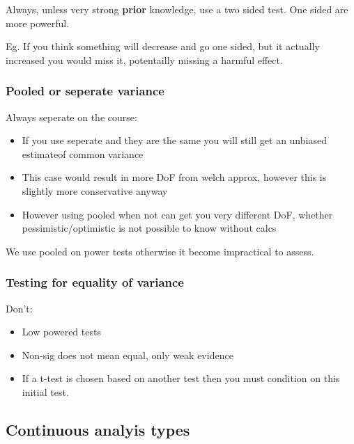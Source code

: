 \documentclass[
  letterpaper,
  DIV=11,
  numbers=noendperiod]{scrreprt}
\providecommand{\tightlist}{%
  \setlength{\itemsep}{0pt}\setlength{\parskip}{0pt}}\usepackage{longtable,booktabs,array}
\begin{document}
Always, unless very strong \textbf{prior} knowledge, use a two sided
test. One sided are more powerful.

Eg. If you think something will decrease and go one sided, but it
actually increased you would miss it, potentailly missing a harmful
effect.

\hypertarget{pooled-or-seperate-variance}{%
\subsubsection{Pooled or seperate
variance}\label{pooled-or-seperate-variance}}

Always seperate on the course:

\begin{itemize}
\tightlist
\item
  If you use seperate and they are the same you will still get an
  unbiased estimateof common variance
\item
  This case would result in more DoF from welch approx, however this is
  slightly more conservative anyway
\item
  However using pooled when not can get you very different DoF, whether
  pessimistic/optimistic is not possible to know without calcs
\end{itemize}

We use pooled on power tests otherwise it become impractical to assess.

\hypertarget{testing-for-equality-of-variance}{%
\subsubsection{Testing for equality of
variance}\label{testing-for-equality-of-variance}}

Don't:

\begin{itemize}
\tightlist
\item
  Low powered tests
\item
  Non-sig does not mean equal, only weak evidence
\item
  If a t-test is chosen based on another test then you must condition on
  this initial test.
\end{itemize}

\hypertarget{continuous-analyis-types}{%
\subsection{Continuous analyis types}\label{continuous-analyis-types}}
\end{document}
